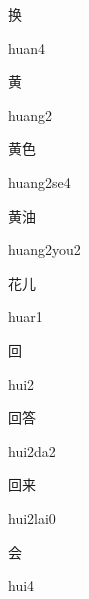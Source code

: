 \begin{multicols*}{2}
\begin{verbete}[huan4]{换}
\begin{pronuncia}{huan4}
\end{pronuncia}
\end{verbete}

\begin{verbete}[huang2]{黄}
\begin{pronuncia}{huang2}
\end{pronuncia}
\end{verbete}

\begin{verbete}[huang2se4]{黄色}
\begin{pronuncia}{huang2se4}
\end{pronuncia}
\end{verbete}

\begin{verbete}{黄油}
\begin{pronuncia}{huang2you2}
\end{pronuncia}
\end{verbete}

\begin{verbete}[huar1]{花儿}
\begin{pronuncia}{huar1}
\end{pronuncia}
\end{verbete}

\begin{verbete}[hui2]{回}
\begin{pronuncia}{hui2}
\end{pronuncia}
\end{verbete}

\begin{verbete}[hui2da2]{回答}
\begin{pronuncia}{hui2da2}
\end{pronuncia}
\end{verbete}

\begin{verbete}{回来}
\begin{pronuncia}{hui2lai0}
\end{pronuncia}
\end{verbete}

\begin{verbete}[hui4]{会}
\begin{pronuncia}{hui4}
\end{pronuncia}
\end{verbete}


\end{multicols*}
